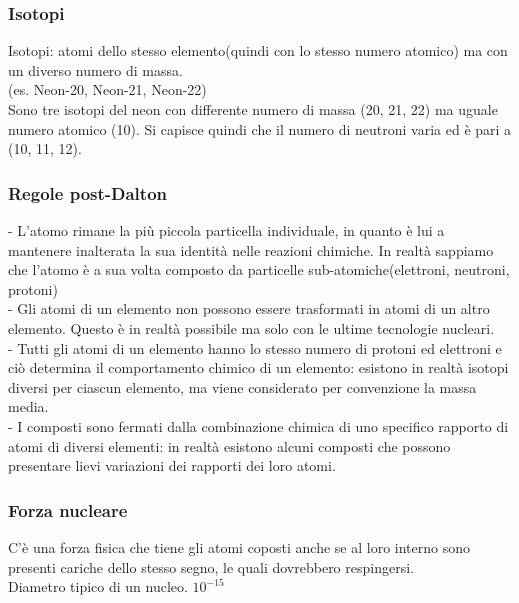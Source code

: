 \subsubsection{Isotopi}
Isotopi: atomi dello stesso elemento(quindi con lo stesso numero atomico) ma con un diverso numero di massa.\\
(es. Neon-20, Neon-21, Neon-22)\\
Sono tre isotopi del neon con differente numero di massa (20, 21, 22) ma uguale numero atomico (10). Si capisce quindi che il numero di neutroni varia ed è pari a (10, 11, 12).
\subsubsection{Regole post-Dalton}
- L'atomo rimane la più piccola particella individuale, in quanto è lui a mantenere inalterata la sua identità nelle reazioni chimiche. In realtà sappiamo che l'atomo è a sua volta composto da particelle sub-atomiche(elettroni, neutroni, protoni)\\
- Gli atomi di un elemento non possono essere trasformati in atomi di un altro elemento. Questo è in realtà possibile ma solo con  le ultime tecnologie nucleari.\\
- Tutti gli atomi di un elemento hanno lo stesso numero di protoni ed elettroni e ciò determina il comportamento chimico di un elemento: esistono in realtà isotopi diversi per ciascun elemento, ma viene considerato per convenzione la massa media.\\
- I composti sono fermati dalla combinazione chimica di uno specifico rapporto di atomi di diversi elementi: in realtà esistono alcuni composti che possono presentare lievi variazioni dei rapporti dei loro atomi.
\subsubsection{Forza nucleare}
C'è una forza fisica che tiene gli atomi coposti anche se al loro interno sono presenti cariche dello stesso segno, le quali dovrebbero respingersi. \\
Diametro tipico di un nucleo. $10^{-15}$
